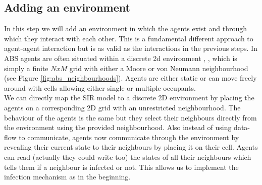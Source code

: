 \subsection{Adding an environment}
In this step we will add an environment in which the agents exist and through which they interact with each other. This is a fundamental different approach to agent-agent interaction but is as valid as the interactions in the previous steps.
In ABS agents are often situated within a discrete 2d environment \cite{schelling_dynamic_1971}, \cite{epstein_growing_1996}, \cite{epstein_agent_zero:_2014} which is simply a finite $N x M$ grid with either a Moore or von Neumann neighbourhood (see Figure \ref{fig:abs_neighbourhoods}). Agents are either static or can move freely around with cells allowing either single or multiple occupants. \\
We can directly map the SIR model to a discrete 2D environment by placing the agents on a corresponding 2D grid with an unrestricted neighbourhood. The behaviour of the agents is the same but they select their neighbours directly from the environment using the provided neighbourhood. Also instead of using data-flow to communicate, agents now communicate through the environment by revealing their current state to their neighbours by placing it on their cell. Agents can read (actually they could write too) the states of all their neighbours which tells them if a neighbour is infected or not. This allows us to implement the infection mechanism as in the beginning.

